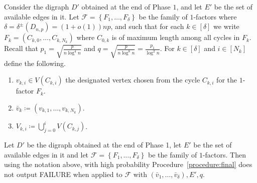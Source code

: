 \documentclass{article}
\begin{document}
	Consider the digraph $D'$ obtained at the end of Phase $1$, and let $E'$ be the set of available edges in it.
	Let $\mathcal F = \left\{F_1, \ldots, F_{\delta} \right\}$ be the family of $1$-factors where $\delta = \delta^{\pm}(D_{n,p}) = (1+o(1))np$, and such that for each $k \in [\delta]$ we write $F_k = \left(C_{k,0}, \ldots, C_{k,N_k} \right)$ where $C_{0,k}$ is of maximum length among all cycles in $F_k$.
	Recall that $p_1 = \sqrt{\frac{p}{n\log^4 n}}$ and $q = \sqrt{\frac{p}{n\log^8 n}} = \frac{p_1}{\log^2 n}$.
	For $k \in [\delta]$ and $i \in [N_k]$ define the following.
	\begin{enumerate}
		\item $v_{k,i} \in V(C_{k,i})$ the designated vertex chosen from the cycle $C_{k,i}$ for the $1$-factor $F_k$.
		\item $\bar{v}_k \coloneqq \left(v_{k,1}, \ldots, v_{k,N_k} \right)$.
		\item $V_{k,i} \coloneqq \bigcup_{j=0}^{i} V(C_{k,j})$.
	\end{enumerate}
	
	
	\begin{lemma}
		\label{lem:final}
		Let $D'$ be the digraph obtained at the end of Phase 1, let $E'$ be the set of available edges in it and let $\mathcal F = \left\{F_1, \ldots, F_{\delta} \right\}$ be the family of $1$-factors.
		Then using the notation above, with high probability Procedure~\ref{procedure:final} does not output FAILURE when applied to $\mathcal F$ with $\left(\bar{v}_1, \ldots, \bar{v}_{\delta} \right), E', q$.
	\end{lemma}
	
\end{document}
